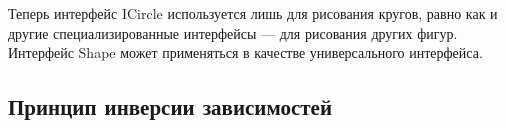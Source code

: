 \documentclass[a4paper]{article}
\begin{document}
\begin{figure}[h]
\end{figure}

Теперь интерфейс ICircle используется лишь для рисования кругов, равно как и другие специализированные интерфейсы — для рисования других фигур. Интерфейс Shape может применяться в качестве универсального интерфейса.

\subsection{Принцип инверсии зависимостей}
\end{document}
